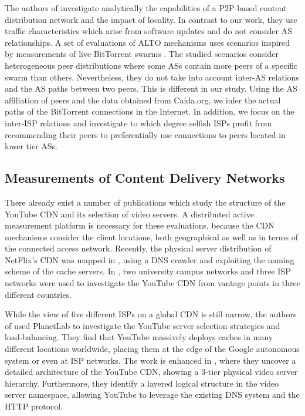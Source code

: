The authors of \cite{gkantsidis2006planet} investigate analytically the capabilities of a P2P-based content distribution network and the impact of locality. In contrast to our work, they use traffic characteristics which arise from software updates and do not consider AS relationships.
A set of evaluations of ALTO mechanisms uses scenarios inspired by measurements of live BitTorrent swarms \cite{Cuevas2011,Blond2011,Lehrieder2011}. The studied scenarios consider heterogeneous peer distributions where some ASs contain more peers of a specific swarm than others. Nevertheless, they do not take into account inter-AS relations and the AS paths between two peers. This is different in our study. Using the AS affiliation of peers and the data obtained from Caida.org, we infer the actual paths of the BitTorrent connections in the Internet. In addition, we focus on the inter-ISP relations and investigate to which degree selfish ISPs profit from recommending their peers to preferentially use connections to peers located in lower tier ASs.

\subsection{Measurements of Content Delivery Networks}\label{aslevel:measurements:cdn}
There already exist a number of publications which study the structure of the YouTube CDN and its selection of video servers.
A distributed active measurement platform is necessary for these evaluations, because the CDN mechanisms consider the client locations, both geographical as well as in terms of the connected access network.
Recently, the physical server distribution of NetFlix's CDN was mapped in \cite{bottger2016open}, using a DNS crawler and exploiting the naming scheme of the cache servers.
In \cite{torres2011dissecting}, two university campus networks and three ISP networks were used to investigate the YouTube CDN from vantage points in three different countries.

While the view of five different ISPs on a global CDN is still narrow, the authors of \cite{adhikari2011you} used PlanetLab to investigate the YouTube server selection strategies and load-balancing.
They find that YouTube massively deploys caches in many different locations worldwide, placing them at the edge of the Google autonomous system or even at ISP networks.
The work is enhanced in \cite{adhikari2012vivisecting}, where they uncover a detailed architecture of the YouTube CDN, showing a 3-tier physical video server hierarchy.
Furthermore, they identify a layered logical structure in the video server namespace, allowing YouTube to leverage the existing DNS system and the HTTP protocol.


